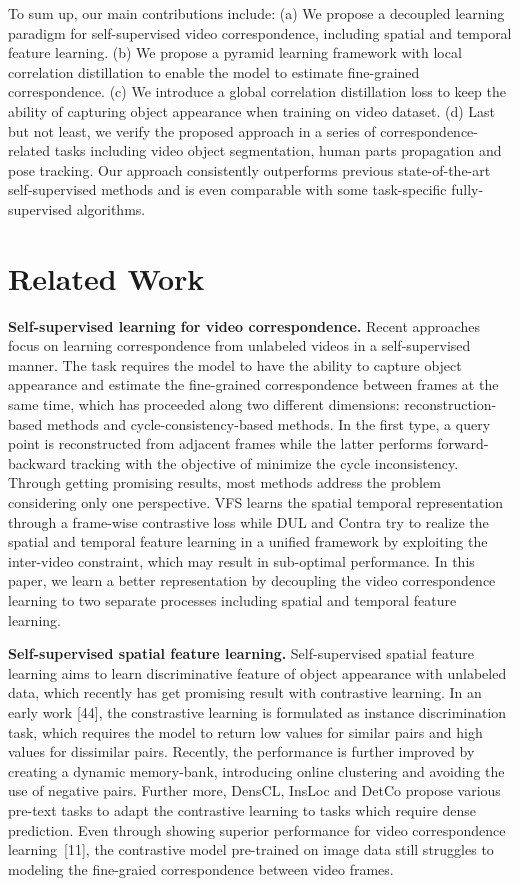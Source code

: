 \documentclass{article}
\begin{document}
To sum up, our main contributions include: (a) We propose a decoupled learning paradigm for self-supervised video correspondence, including spatial and temporal feature learning. (b) We propose a pyramid learning framework with local correlation distillation to enable the model to estimate fine-grained correspondence. (c) We introduce a global correlation distillation loss to keep the ability of capturing object appearance when training on video dataset. (d) Last but not least, we verify the proposed approach in a series of correspondence-related tasks including video object segmentation, human parts propagation and pose tracking. Our approach consistently outperforms previous state-of-the-art self-supervised methods and is even comparable with some task-specific fully-supervised algorithms.

\section{Related Work}
\textbf{Self-supervised learning for video correspondence.} 
Recent approaches focus on learning correspondence from unlabeled videos in a self-supervised manner. The task requires the model to have the ability to capture object appearance and estimate the fine-grained correspondence between frames at the same time, which has proceeded along two different dimensions: reconstruction-based methods and cycle-consistency-based methods. In the first type, a query point is reconstructed from adjacent frames while the latter performs forward-backward tracking with the objective of minimize the cycle inconsistency. Through getting promising results, most methods address the problem considering only one perspective. VFS learns the spatial temporal representation through a frame-wise contrastive loss while DUL and Contra try to realize the spatial and temporal feature learning in a unified framework by exploiting the inter-video constraint, which may result in sub-optimal performance. In this paper, we learn a better representation by decoupling the video correspondence learning to two separate processes including spatial and temporal feature learning.


\textbf{Self-supervised spatial feature learning.} Self-supervised spatial feature learning aims to learn discriminative feature of object appearance with unlabeled data, which recently has get promising result with contrastive learning. In an early work [44], the constrastive learning is formulated as instance discrimination task, which requires the model to return low values for similar pairs and high values for dissimilar pairs. Recently, the performance is further improved by creating a dynamic memory-bank, introducing online clustering and avoiding the use of negative pairs. Further more, DensCL, InsLoc and DetCo propose various pre-text tasks to adapt the contrastive learning to tasks which require dense prediction. Even through showing superior performance for video correspondence learning~[11], the contrastive model pre-trained on image data still struggles to modeling the fine-graied correspondence between video frames. 
\end{document}
